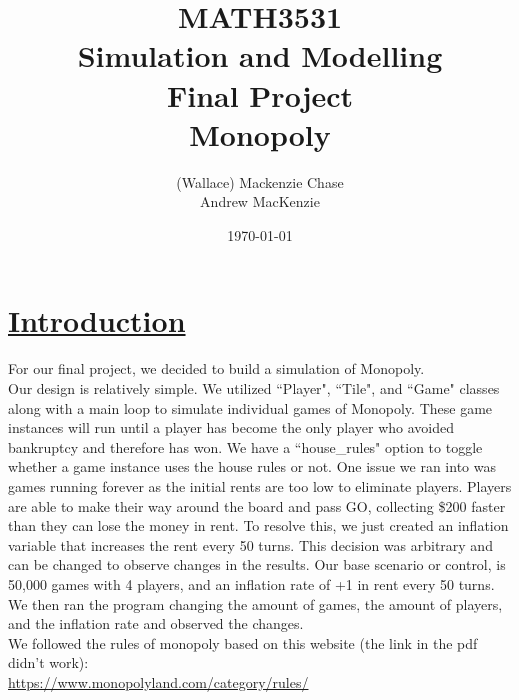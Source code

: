 \documentclass[a4paper,reqno,12pt]{report}
\begin{document}
\title{%
  MATH3531\\
  Simulation and Modelling\\
  Final Project\\
  Monopoly
  }
\author{(Wallace) Mackenzie Chase\\
Andrew MacKenzie}
\date{\today}
\maketitle
\clearpage

\section*{\underline{Introduction}}
For our final project, we decided to build a simulation of Monopoly.
\\
Our design is relatively simple. We utilized ``Player", ``Tile", and ``Game" classes along with a main loop to simulate individual games of Monopoly. These game instances will run until a player has become the only player who avoided bankruptcy and therefore has won. We have a ``house\_rules" option to toggle whether a game instance uses the house rules or not. One issue we ran into was games running forever as the initial rents are too low to eliminate players. Players are able to make their way around the board and pass GO, collecting \$200 faster than they can lose the money in rent. To resolve this, we just created an inflation variable that increases the rent every 50 turns. This decision was arbitrary and can be changed to observe changes in the results. Our base scenario or control, is 50,000 games with 4 players, and an inflation rate of +1 in rent every 50 turns. We then ran the program changing the amount of games, the amount of players, and the inflation rate and observed the changes.
\\
We followed the rules of monopoly based on this website (the link in the pdf didn't work): 
\\
\url{https://www.monopolyland.com/category/rules/}
\end{document}
